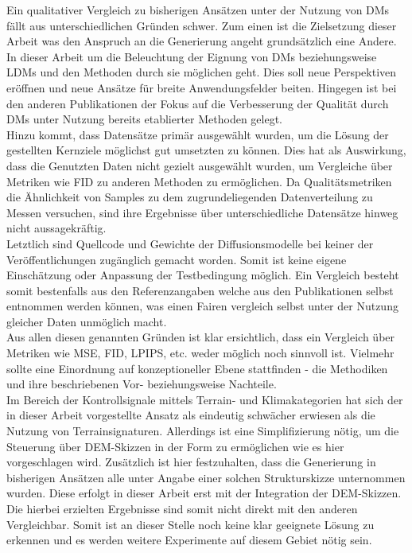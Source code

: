 Ein qualitativer Vergleich zu bisherigen Ansätzen unter der Nutzung von DMs fällt aus unterschiedlichen Gründen schwer. Zum einen ist die Zielsetzung dieser Arbeit was den Anspruch an die Generierung angeht grundsätzlich eine Andere. In dieser Arbeit um die Beleuchtung der Eignung von DMs beziehungsweise LDMs und den Methoden durch sie möglichen geht. Dies soll neue Perspektiven eröffnen und neue Ansätze für breite Anwendungsfelder beiten. Hingegen ist bei den anderen Publikationen der Fokus auf die Verbesserung der Qualität durch DMs unter Nutzung bereits etablierter Methoden gelegt. \\
Hinzu kommt, dass Datensätze primär ausgewählt wurden, um die Lösung der gestellten Kernziele möglichst gut umsetzten zu können. Dies hat als Auswirkung, dass die Genutzten Daten nicht gezielt ausgewählt wurden, um Vergleiche über Metriken wie FID zu anderen Methoden zu ermöglichen. Da Qualitätsmetriken die Ähnlichkeit von Samples zu dem zugrundeliegenden Datenverteilung zu Messen versuchen, sind ihre Ergebnisse über unterschiedliche Datensätze hinweg nicht aussagekräftig. \\ 
Letztlich sind Quellcode und Gewichte der Diffusionsmodelle bei keiner der Veröffentlichungen zugänglich gemacht worden. Somit ist keine eigene Einschätzung oder Anpassung der Testbedingung möglich. Ein Vergleich besteht somit bestenfalls aus den Referenzangaben welche aus den Publikationen selbst entnommen werden können, was einen Fairen vergleich selbst unter der Nutzung gleicher Daten unmöglich macht. \\
Aus allen diesen genannten Gründen ist klar ersichtlich, dass ein Vergleich über Metriken wie MSE, FID, LPIPS, etc. weder möglich noch sinnvoll ist. Vielmehr sollte eine Einordnung auf konzeptioneller Ebene stattfinden - die Methodiken und ihre beschriebenen Vor- beziehungsweise Nachteile. \\
Im Bereich der Kontrollsignale mittels Terrain- und Klimakategorien hat sich der in dieser Arbeit vorgestellte Ansatz als eindeutig schwächer erwiesen als die Nutzung von Terrainsignaturen. Allerdings ist eine Simplifizierung nötig, um die Steuerung über DEM-Skizzen in der Form zu ermöglichen wie es hier vorgeschlagen wird. Zusätzlich ist hier festzuhalten, dass die Generierung in bisherigen Ansätzen alle unter Angabe einer solchen Strukturskizze unternommen wurden. Diese erfolgt in dieser Arbeit erst mit der Integration der \ac{DEM}-Skizzen. Die hierbei erzielten Ergebnisse sind somit nicht direkt mit den anderen Vergleichbar. Somit ist an dieser Stelle noch keine klar geeignete Lösung zu erkennen und es werden weitere Experimente auf diesem Gebiet nötig sein. \\
